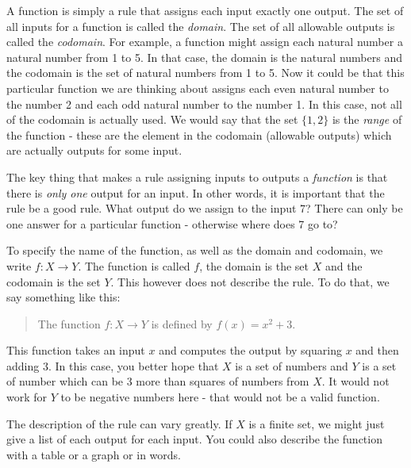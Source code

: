 \documentclass[12pt]{article}
\begin{document}
A function is simply a rule that assigns each input exactly one output.  The set of all inputs for a function is called the {\em domain}.  The set of all allowable outputs is called the {\em codomain}.  For example, a function might assign each natural number a natural number from 1 to 5.  In that case, the domain is the natural numbers and the codomain is the set of natural numbers from 1 to 5. Now it could be that this particular function we are thinking about assigns each even natural number to the number 2 and each odd natural number to the number 1.  In this case, not all of the codomain is actually used.  We would say that the set $\{1,2\}$ is the {\em range} of the function - these are the element in the codomain (allowable outputs) which are actually outputs for some input. 

The key thing that makes a rule assigning inputs to outputs a {\em function} is that there is {\em only one} output for an input.  In other words, it is important that the rule be a good rule.  What output do we assign to the input 7?  There can only be one answer for a particular function - otherwise where does 7 go to?  

To specify the name of the function, as well as the domain and codomain, we write $f:X \to Y$.  The function is called $f$, the domain is the set $X$ and the codomain is the set $Y$.  This however does not describe the rule.  To do that, we say something like this:

\begin{quote}
  The function $f:X \to Y$ is defined by $f(x) = x^2 + 3$.
\end{quote}

This function takes an input $x$ and computes the output by squaring $x$ and then adding 3.  In this case, you better hope that $X$ is a set of numbers and $Y$ is a set of number which can be 3 more than squares of numbers from $X$.  It would not work for $Y$ to be negative numbers here - that would not be a valid function.

The description of the rule can vary greatly.  If $X$ is a finite set, we might just give a list of each output for each input.  You could also describe the function with a table or a graph or in words.
\end{document}
